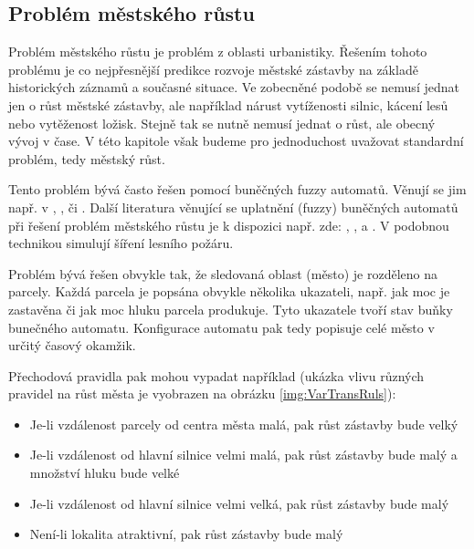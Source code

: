 \documentclass[a4paper,10pt]{article}
\begin{document}
\subsection{Problém městského růstu} \label{subs:UrbGrow}
Problém městského růstu je problém z oblasti urbanistiky. Řešením tohoto problému je co nejpřesnější predikce rozvoje městské zástavby na základě historických záznamů a současné situace. Ve zobecněné podobě se nemusí jednat jen o růst městské zástavby, ale například nárust vytíženosti silnic, kácení lesů nebo vytěženost ložisk. Stejně tak se nutně nemusí jednat o růst, ale obecný vývoj v čase. V této kapitole však budeme pro jednoduchost uvažovat standardní problém, tedy městský růst.

Tento problém bývá často řešen pomocí buněčných fuzzy automatů. Věnují se jim např. v \cite{AlAhHep+-ModUrbGroDynUsCelAutGIS}, \cite{Ahm+-CalFuzCelAutModUrbDynSauAr} \cite{War+-StoConCelModUrbGro} \cite{WhiEng-CelAutBasIntDynRegMod}  \cite{LaiDraSch-IntMulEvCelAutMetLanSimMod} \cite{ManHatPra-FuzCelAutBasSheModUrGro+}, \cite{ManHatPra-ModUrbGroUsFuzCelAut} či \cite{Wu-CalStoCelAutAppRurUrbLanConv}. %
%
Další literatura věnující se uplatnění (fuzzy) buněčných automatů při řešení problém městského růstu je k dispozici např. zde: \cite{PowSimWhi-HieFuzzPattMatcRegCompLanUseMap}, \cite{Dra-CouFuzSetTheGisBaCelAutLanUseChaMod}, \cite{WasPar-PreSpaDisEleEnCon+} a \cite{LiuPhi-DevCelAutModUrbGroIncFuzSetApp}. V \cite{MraZimLapBaj-FuzCelAut+} podobnou technikou simulují šíření lesního požáru.

Problém bývá řešen obvykle tak, že sledovaná oblast (město) je rozděleno na parcely. Každá parcela je popsána obvykle několika ukazateli, např. jak moc je zastavěna či jak moc hluku parcela produkuje. Tyto ukazatele tvoří stav buňky bunečného automatu. Konfigurace automatu pak tedy popisuje celé město v určitý časový okamžik.

Přechodová pravidla pak mohou vypadat například (ukázka vlivu různých pravidel na růst města je vyobrazen na obrázku \ref{img:VarTransRuls}):
\begin{itemize}
 \item Je-li vzdálenost parcely od centra města malá, pak růst zástavby bude velký
 \item Je-li vzdálenost od hlavní silnice velmi malá, pak růst zástavby bude malý a množství hluku bude velké
 \item Je-li vzdálenost od hlavní silnice velmi velká, pak růst zástavby bude malý
 \item Není-li lokalita atraktivní, pak růst zástavby bude malý
\end{itemize}
\end{document}
